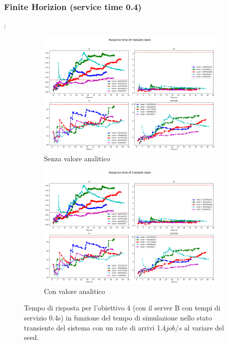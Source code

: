 \subsubsection{Finite Horizion (service time 0.4)}
\begin{frame}{\subsecname: \subsubsecname}
    \begin{figure}
        \centering
        \begin{subfigure}{\linewidth}
            \centering
            \includegraphics[width=0.8\linewidth]{figs/appendices/transient/obj4_04-transient-rtime-analitycal.png}
            \caption{Senza valore analitico}
            \label{fig:obj4_04_transient_simulation}
            \end{subfigure} 
        \begin{subfigure}{\linewidth}
            \centering
            \includegraphics[width=0.8\linewidth]{figs/appendices/transient/obj4_04-transient-rtime-analitycal.png}
            \caption{Con valore analitico}
            \label{fig:obj4_04_transient_analitycal}
            \end{subfigure}
        \caption{Tempo di risposta per l'obiettivo 4 (con il server B con tempi di servizio 0.4s) in funzione del tempo di simulazione nello stato transiente del sistema con un rate di arrivi 1.4$job/s$ al variare del seed.}
        \label{fig:obj4_04_transient}
    \end{figure}
\end{frame}


